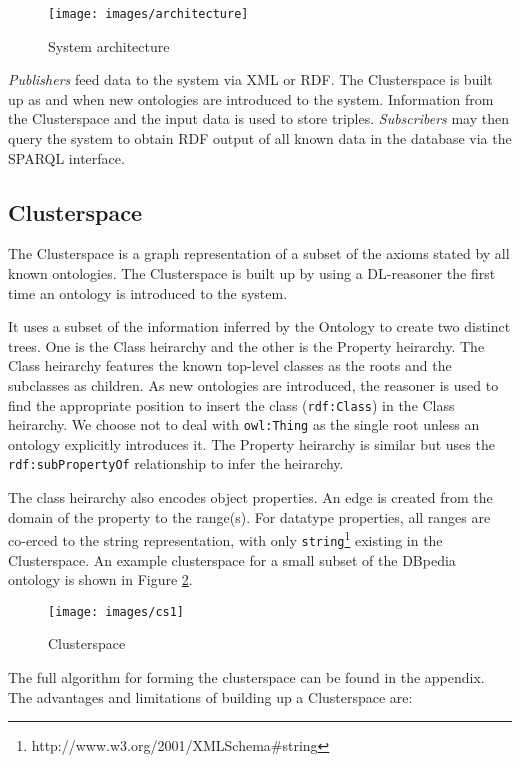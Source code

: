 \documentclass[journal]{IEEEtran}
\begin{document}
\begin{figure}[h]
    \centering
    \texttt{[image: images/architecture]}
    \caption{System architecture}
    \label{fig:architecture}
\end{figure}

\emph{Publishers} feed data to the system via XML or RDF. The Clusterspace is
built up as and when new ontologies are introduced to the system. Information
from the Clusterspace and the input data is used to store triples.
\emph{Subscribers} may then query the system to obtain RDF output of all known
data in the database via the SPARQL interface.

\subsection{Clusterspace}
The Clusterspace is a graph representation of a subset of the axioms stated by
all known ontologies. The Clusterspace is built up by using a DL-reasoner the
first time an ontology is introduced to the system.

It uses a subset of the information inferred by the Ontology to create two
distinct trees. One is the Class heirarchy and the other is the Property
heirarchy. The Class heirarchy features the known top-level classes as the
roots and the subclasses as children. As new ontologies are introduced, the
reasoner is used to find the appropriate position to insert the class
(\texttt{rdf:Class}) in the Class heirarchy. We choose not to deal with
\texttt{owl:Thing} as the single root unless an ontology explicitly introduces
it. The Property heirarchy is similar but uses the \texttt{rdf:subPropertyOf}
relationship to infer the heirarchy.

The class heirarchy also encodes object properties. An edge is created from the
domain of the property to the range(s). For datatype properties, all ranges are
co-erced to the string representation, with only
\texttt{string}\footnote{http://www.w3.org/2001/XMLSchema\#string} existing in
the Clusterspace. An example clusterspace for a small subset of the DBpedia
ontology is shown in Figure \ref{fig:cs}.

\begin{figure}[h]
    \centering
    \texttt{[image: images/cs1]}
    \caption{Clusterspace}
    \label{fig:cs}
\end{figure}

The full algorithm for forming the clusterspace can be found in the appendix. %
The advantages and limitations of building up a Clusterspace are:
\end{document}
